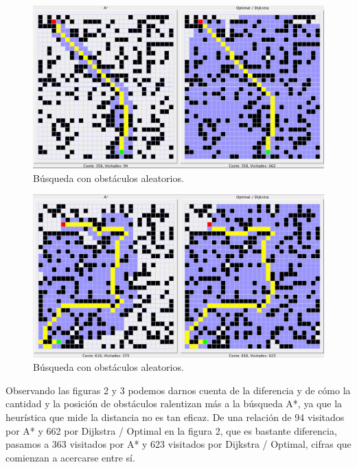 \documentclass{article}
\begin{document}
\begin{figure}[h!]
    \caption{Búsqueda con obstáculos aleatorios.}
    \includegraphics[width=\textwidth]{resources/versus2}
\end{figure}

\begin{figure}[h!]
    \caption{Búsqueda con obstáculos aleatorios.}
    \includegraphics[width=\textwidth]{resources/versus3}
\end{figure}

Observando las figuras 2 y 3 podemos darnos cuenta de la diferencia y de cómo la cantidad y la posición de obstáculos ralentizan más a la búsqueda A*, ya que la heurística que mide la distancia no es tan eficaz. De una relación de 94 visitados por A* y 662 por Dijkstra / Optimal en la figura 2, que es bastante diferencia, pasamos a 363 visitados por A* y 623 visitados por Dijkstra / Optimal, cifras que comienzan a acercarse entre sí.
\end{document}

